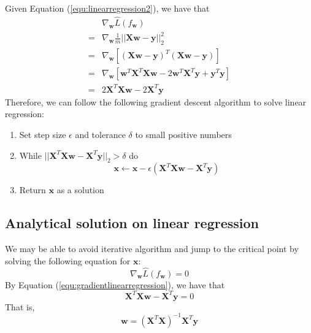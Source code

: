 Given Equation (\ref{equ:linearregression2}), we have that 
\begin{equation}\label{equ:gradientlinearregression}
    \begin{array}{cl}
         & \nabla_{\textbf{w}}\hat{L}(f_{\textbf{w}}) \\
        = &  \nabla_{\textbf{w}}\frac{1}{m} ||\textbf{X}\textbf{w} - \textbf{y}||_2^2 \\
        = & \nabla_{\textbf{w}}[(\textbf{X}\textbf{w} - \textbf{y})^T(\textbf{X}\textbf{w} - \textbf{y})]\\
        = & \nabla_{\textbf{w}}[\textbf{w}^T\textbf{X}^T\textbf{X}\textbf{w}-2\textbf{w}^T\textbf{X}^T\textbf{y}+\textbf{y}^T\textbf{y}]\\
         = & 2 \textbf{X}^T\textbf{X}\textbf{w} - 2 \textbf{X}^T\textbf{y}
    \end{array}
\end{equation}
Therefore, we can follow the following gradient descent algorithm to solve linear regression: 
\begin{enumerate}
    \item Set step size $\epsilon$ and tolerance $\delta$ to small positive numbers
    \item While $|| \textbf{X}^T\textbf{X}\textbf{w} -  \textbf{X}^T\textbf{y}||_2 > \delta$ do \begin{equation}
        \textbf{x} \leftarrow \textbf{x} - \epsilon(\textbf{X}^T\textbf{X}\textbf{w} -  \textbf{X}^T\textbf{y})
    \end{equation}
    \item Return $\textbf{x}$ as a solution
\end{enumerate}


\subsection*{Analytical solution on linear regression}

We may be able to avoid iterative algorithm and jump to the critical point by solving the following equation for $\textbf{x}$: 
\begin{equation}
    \nabla_{\textbf{w}}\hat{L}(f_{\textbf{w}}) = 0
\end{equation}
By Equation (\ref{equ:gradientlinearregression}), we have that 
\begin{equation}
     \textbf{X}^T\textbf{X}\textbf{w} -  \textbf{X}^T\textbf{y} = 0
\end{equation}
That is, 
\begin{equation}
    \textbf{w} = (\textbf{X}^T\textbf{X})^{-1}\textbf{X}^T\textbf{y}
\end{equation}